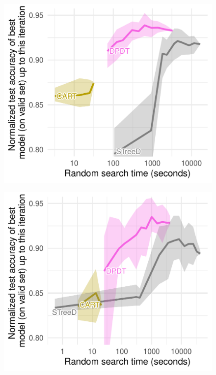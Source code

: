 \begin{figure}
\begin{minipage}{0.24\textwidth}
        \label{fig:gen-cat}
    \end{minipage}
        \centering
    \begin{minipage}{0.24\textwidth}
        \includegraphics[width=\textwidth]{images/figures/tab_bench/benchmark_time_numerical_classif.pdf}
        \label{fig:gen-num-time}
    \end{minipage}
    \begin{minipage}{0.24\textwidth}
        \includegraphics[width=\textwidth]{images/figures/tab_bench/benchmark_time_categorical_classif.pdf}

\end{minipage}
\end{figure}
